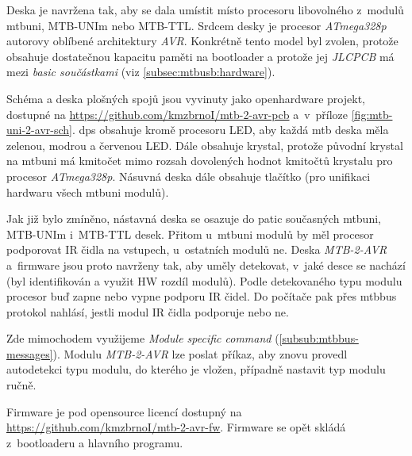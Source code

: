 Deska je navržena tak, aby se dala umístit místo procesoru libovolného z~modulů
\gls{mtbuni}, MTB-UNIm nebo MTB-TTL. Srdcem desky je procesor
\textit{ATmega328p} autorovy oblíbené architektury \textit{AVR}.
Konkrétně tento model byl zvolen, protože obsahuje dostatečnou kapacitu paměti
na bootloader a protože jej \textit{JLCPCB} má mezi \textit{basic součástkami}
(viz \ref{subsec:mtbusb:hardware}).

Schéma a deska plošných spojů jsou vyvinuty jako openhardware projekt, dostupné
na \url{https://github.com/kmzbrnoI/mtb-2-avr-pcb} a~v~příloze
\ref{fig:mtb-uni-2-avr-sch}. \gls{dps} obsahuje kromě procesoru LED, aby každá
\gls{mtb} deska měla zelenou, modrou a červenou LED. Dále obsahuje krystal,
protože původní krystal na \gls{mtbuni} má kmitočet mimo rozsah dovolených
hodnot kmitočtů krystalu pro procesor \textit{ATmega328p}. Násuvná deska dále
obsahuje tlačítko (pro unifikaci hardwaru všech \gls{mtbuni} modulů).

Jak již bylo zmíněno, nástavná deska se osazuje do patic současných
\gls{mtbuni}, MTB-UNIm i~MTB-TTL desek. Přitom u~\gls{mtbuni} modulů by měl
procesor podporovat IR čidla na vstupech, u~ostatních modulů ne. Deska \textit{MTB-2-AVR}
a~firmware jsou proto navrženy tak, aby uměly detekovat, v~jaké desce se
nachází (byl identifikován a využit HW rozdíl modulů). Podle detekovaného typu
modulu procesor buď zapne nebo vypne podporu IR čidel. Do počítače pak přes
\gls{mtbbus} protokol nahlásí, jestli modul IR čidla podporuje nebo ne.

Zde mimochodem využijeme \textit{Module specific command}
(\ref{subsub:mtbbus-messages}). Modulu \textit{MTB-2-AVR} lze poslat příkaz,
aby znovu provedl autodetekci typu modulu, do kterého je vložen, případně
nastavit typ modulu ručně.

Firmware je pod opensource licencí dostupný na
\url{https://github.com/kmzbrnoI/mtb-2-avr-fw}. Firmware se opět skládá
z~bootloaderu a hlavního programu.
